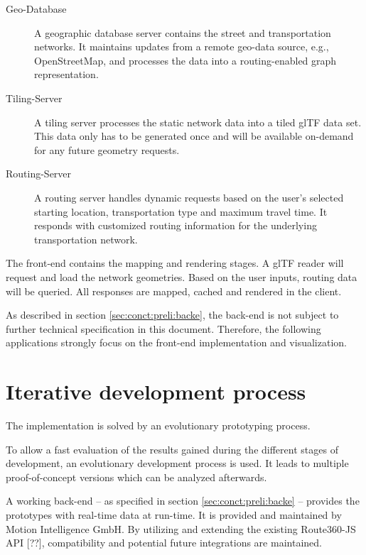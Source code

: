     \begin{description}
      \item[Geo-Database] A geographic database server contains the street and
        transportation networks. It maintains updates from a remote geo-data
        source, e.g., OpenStreetMap, and processes the data into a
        routing-enabled graph representation.
      \item[Tiling-Server] A tiling server processes the static network data
        into a tiled glTF data set. This data only has to be generated once and
        will be available on-demand for any future geometry requests.
      \item[Routing-Server] A routing server handles dynamic requests based on
        the user's selected starting location, transportation type and maximum
        travel time. It responds with customized routing information for the
        underlying transportation network.
    \end{description}

    The front-end contains the mapping and rendering stages. A glTF reader will
    request and load the network geometries. Based on the user inputs, routing
    data will be queried. All responses are mapped, cached and rendered in the
    client.\par

    As described in section \ref{sec:conct:preli:backe}, the back-end is not
    subject to further technical specification in this document. Therefore, the
    following applications strongly focus on the front-end implementation and
    visualization.\par

  \section{Iterative development process}
    \label{sec:imple:cycle}
    The implementation is solved by an evolutionary prototyping process.\par

    To allow a fast evaluation of the results gained during the different stages
    of development, an evolutionary development process is used. It leads to
    multiple proof-of-concept versions which can be analyzed afterwards.\par

    A working back-end -- as specified in section \ref{sec:conct:preli:backe} --
    provides the prototypes with real-time data at run-time. It is provided and
    maintained by Motion Intelligence GmbH. By utilizing and extending the
    existing Route360-JS API [??], compatibility and potential future
    integrations are maintained.\par

